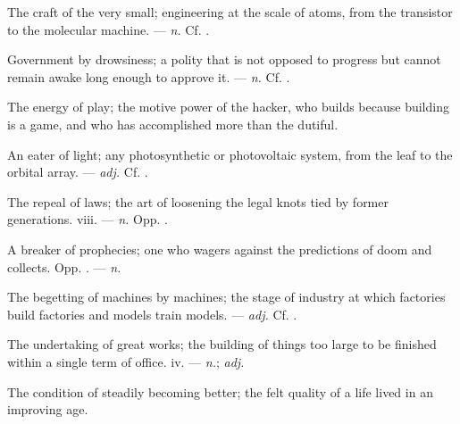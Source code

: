  The craft of the very small; engineering at the scale of atoms, from the transistor to the molecular machine. ---  \textit{n.} Cf. .

 Government by drowsiness; a polity that is not opposed to progress but cannot remain awake long enough to approve it. ---  \textit{n.} Cf. .

 The energy of play; the motive power of the hacker, who builds because building is a game, and who has accomplished more than the dutiful.  

 An eater of light; any photosynthetic or photovoltaic system, from the leaf to the orbital array. ---  \textit{adj.} Cf. .

 The repeal of laws; the art of loosening the legal knots tied by former generations.   viii. ---  \textit{n.} Opp. .

 A breaker of prophecies; one who wagers against the predictions of doom and collects. Opp. . ---  \textit{n.}

 The begetting of machines by machines; the stage of industry at which factories build factories and models train models. ---  \textit{adj.} Cf. .

 The undertaking of great works; the building of things too large to be finished within a single term of office.   iv. ---  \textit{n.};  \textit{adj.}

 The condition of steadily becoming better; the felt quality of a life lived in an improving age.

